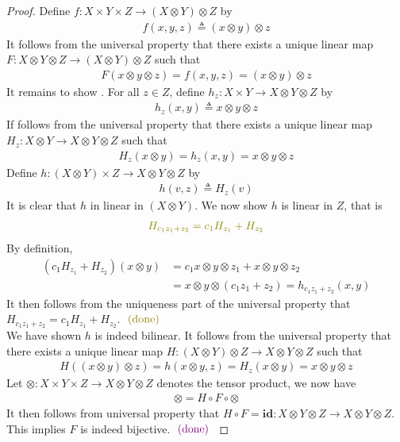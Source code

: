 \documentclass{report}
\begin{document}
\begin{proof}
Define $f:X\times Y \times Z\rightarrow (X\otimes  Y)\otimes Z$ by 
\begin{align*}
f(x,y,z)\triangleq (x \otimes  y)\otimes z
\end{align*}
It follows from the universal property that there exists a unique linear map $F:X\otimes  Y\otimes Z\rightarrow (X \otimes  Y)\otimes  Z $ such that 
\begin{align*}
F(x\otimes  y\otimes  z)=f(x,y,z)= (x \otimes y) \otimes z 
\end{align*}
It remains to show .  For all $z\in Z$, define $h_z:X\times Y\rightarrow X \otimes  Y\otimes Z$ by 
\begin{align*}
h_z(x,y)\triangleq x\otimes  y\otimes  z
\end{align*}
If follows from the universal property that there exists a unique linear map $H_z:X\otimes  Y \rightarrow X \otimes  Y\otimes  Z$ such that 
\begin{align*}
H_z(x \otimes  y)=h_z(x,y)=x \otimes  y \otimes  z
\end{align*}
Define $h:(X\otimes  Y)\times Z\rightarrow X\otimes Y \otimes Z$ by 
\begin{align*}
h(v,z)\triangleq H_z(v)
\end{align*}
It is clear that $h$ in linear in  $(X\otimes  Y)$. We now show $h$ is linear in  $Z$, that is 
 \begin{align*}
   \olive{H_{c_1z_1+z_2}=c_1H_{z_1}+H_{z_2}}
\end{align*}
By definition, 
\begin{align*}
  (c_1H_{z_1}+H_{z_2})(x\otimes  y)&=c_1 x\otimes  y\otimes  z_1+ x\otimes  y \otimes  z_2\\
  &= x\otimes  y\otimes  (c_1z_1+z_2)=h_{c_1z_1+z_2}(x,y)
\end{align*}
It then follows from the uniqueness part of the universal property that $H_{c_1z_1+z_2}=c_1H_{z_1}+H_{z_2}$. $\odone$  \\


We have shown $h$ is indeed bilinear. It follows from the universal property that there exists a unique linear map $H:(X\otimes  Y)\otimes  Z\rightarrow X\otimes Y\otimes Z$ such that 
\begin{align*}
H((x\otimes y)\otimes z)=h(x\otimes  y,z)=H_z(x\otimes  y)=x\otimes  y\otimes  z
\end{align*}
Let $\otimes:X\times Y\times Z\rightarrow X\otimes  Y\otimes  Z$ denotes the tensor product, we now have 
\begin{align*}
\otimes = H \circ F \circ \otimes 
\end{align*}
It then follows from universal property that $H \circ F=\textbf{id}:X\otimes  Y\otimes  Z\rightarrow X\otimes  Y\otimes  Z$. This implies $F$ is indeed bijective. $\textcolor{violet}{\text{ (done) }}$
\end{proof}
\end{document}
